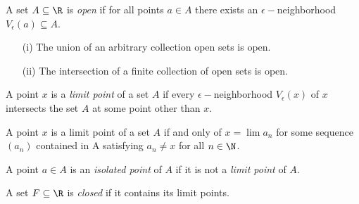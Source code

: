 \begin{tcolorbox}
\begin{defn}
    A set \( A \subseteq \R  \) is \textit{open} if for all points \( a \in A \) there exists an \( \epsilon - \)neighborhood \(  V_{\epsilon }(a) \subseteq A \). 
\end{defn}
\end{tcolorbox}

\begin{tcolorbox}
\begin{thm}
\begin{enumerate}
    \item[(i)] The union of an arbitrary collection open sets is open.
    \item[(ii)] The intersection of a finite collection of open sets is open. 
\end{enumerate}
\end{thm}

\end{tcolorbox}
\begin{tcolorbox}
\begin{defn}
    A point \( x \) is a \textit{limit point} of a set \( A  \) if every \( \epsilon- \)neighborhood \( V_{\epsilon }(x) \) of \( x \) intersects the set \( A  \) at some point other than \( x \). 
\end{defn}
\end{tcolorbox}


\begin{tcolorbox}
\begin{thm}
A point \( x \) is a limit point of a set \( A \) if and only of \( x = \lim a_n \) for some sequence \( (a_n) \) contained in A satisfying \( a_n \neq x  \) for all \( n \in \N  \). 
\end{thm}
\end{tcolorbox}

\begin{tcolorbox}
\begin{defn}
A point \( a \in A  \) is an \textit{isolated point} of \( A \) if it is not a \textit{limit point} of \( A \).  
\end{defn}
\end{tcolorbox}

\begin{tcolorbox}
\begin{defn}
A set \( F \subseteq \R  \) is \textit{closed} if it contains its limit points. 
\end{defn}
\end{tcolorbox}

